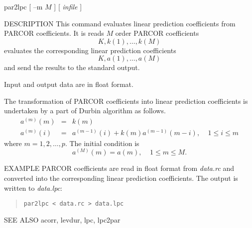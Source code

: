 
\begin{synopsis}
\item [par2lpc] [ --m $M$ ] [ {\em infile} ] 
\end{synopsis}

\begin{qsection}{DESCRIPTION}
This command evaluates linear prediction coefficients
from PARCOR coefficients.
It is reads $M$ order PARCOR coefficients
\begin{displaymath}
  K, k(1),\ldots, k(M)
\end{displaymath}
evaluates the corresponding linear prediction coefficients
\begin{displaymath}
  K, a(1),\ldots, a(M)
\end{displaymath}
and send the results to the standard output.
\par
Input and output data are in float format.
\par
The transformation of PARCOR coefficients into 
linear prediction coefficients is undertaken 
by a part of Durbin algorithm as follows.
\begin{eqnarray*} 
a^{(m)}(m) &=& k(m) \\
a^{(m)}(i) &=& a^{(m-1)}(i) + k(m) a^{(m-1)}(m-i), ~~~~~1\leq i \leq m
\end{eqnarray*}
where  $m=1, 2, \ldots, p$.
The initial condition is 
\begin{displaymath}
a^{(M)}(m) = a(m), ~~~~~1 \leq m \leq M.
\end{displaymath}
\end{qsection}

\begin{options}
\end{options}

\begin{qsection}{EXAMPLE}
PARCOR coefficients are read in float format from {\em data.rc}
and converted into the corresponding linear prediction coefficients.
The output is written to {\em data.lpc}:
\begin{quote}
 \verb!par2lpc < data.rc > data.lpc!
\end{quote} 
\end{qsection}

\begin{qsection}{SEE ALSO}
acorr, levdur, lpc, lpc2par
\end{qsection}
